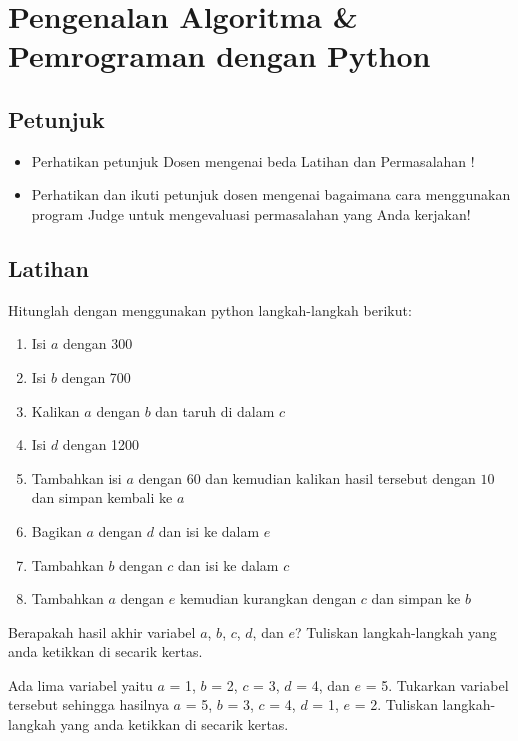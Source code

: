\chapter{Pengenalan Algoritma \& Pemrograman dengan Python}

\section{Petunjuk}
\begin{itemize}
	\item Perhatikan petunjuk Dosen mengenai beda Latihan dan Permasalahan !
	\
	\item Perhatikan dan ikuti petunjuk dosen mengenai bagaimana cara menggunakan program Judge untuk mengevaluasi permasalahan yang Anda kerjakan!
\end{itemize}

\section{Latihan}
\begin{latihan}
Hitunglah dengan menggunakan python langkah-langkah berikut:
\begin{enumerate}
	\item Isi $a$ dengan 300
	\item Isi $b$ dengan 700
	\item Kalikan $a$ dengan $b$ dan taruh di dalam $c$
	\item Isi $d$ dengan 1200
	\item Tambahkan isi $a$ dengan 60 dan kemudian kalikan hasil tersebut dengan $10$ dan simpan kembali ke $a$   
	\item Bagikan $a$ dengan $d$ dan isi ke dalam $e$
	\item Tambahkan $b$ dengan $c$ dan isi ke dalam $c$
	\item Tambahkan $a$ dengan $e$ kemudian kurangkan dengan $c$ dan simpan ke $b$
\end{enumerate}
Berapakah hasil akhir variabel $a$, $b$, $c$, $d$, dan $e$? 
Tuliskan langkah-langkah yang anda ketikkan di secarik kertas.
\end{latihan}

\begin{latihan}
Ada lima variabel yaitu $a$ = 1, $b$ = 2, $c$ = 3, $d$ = 4, dan $e$ = 5. Tukarkan variabel tersebut sehingga hasilnya $a$ = 5, $b$ = 3, $c$ = 4, $d$ = 1, $e$ = 2. Tuliskan langkah-langkah yang anda ketikkan di secarik kertas. 
\end{latihan}


